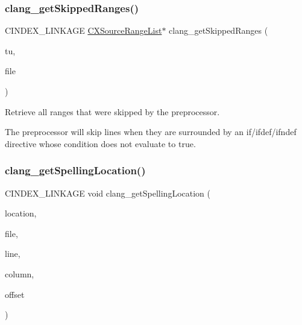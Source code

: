 \subsubsection{\texorpdfstring{clang\+\_\+get\+Skipped\+Ranges()}{clang\_getSkippedRanges()}}
{\footnotesize\ttfamily C\+I\+N\+D\+E\+X\+\_\+\+L\+I\+N\+K\+A\+GE \hyperlink{structCXSourceRangeList}{C\+X\+Source\+Range\+List}$\ast$ clang\+\_\+get\+Skipped\+Ranges (\begin{DoxyParamCaption}\item[{\hyperlink{group__CINDEX_gacdb7815736ca709ce9a5e1ec2b7e16ac}{C\+X\+Translation\+Unit}}]{tu,  }\item[{\hyperlink{group__CINDEX__FILES_gacfcea9c1239c916597e2e5b3e109215a}{C\+X\+File}}]{file }\end{DoxyParamCaption})}



Retrieve all ranges that were skipped by the preprocessor. 

The preprocessor will skip lines when they are surrounded by an if/ifdef/ifndef directive whose condition does not evaluate to true. \mbox{\label{group__CINDEX__LOCATIONS_ga01f1a342f7807ea742aedd2c61c46fa0}} 
\subsubsection{\texorpdfstring{clang\+\_\+get\+Spelling\+Location()}{clang\_getSpellingLocation()}}
{\footnotesize\ttfamily C\+I\+N\+D\+E\+X\+\_\+\+L\+I\+N\+K\+A\+GE void clang\+\_\+get\+Spelling\+Location (\begin{DoxyParamCaption}\item[{\hyperlink{structCXSourceLocation}{C\+X\+Source\+Location}}]{location,  }\item[{\hyperlink{group__CINDEX__FILES_gacfcea9c1239c916597e2e5b3e109215a}{C\+X\+File} $\ast$}]{file,  }\item[{unsigned $\ast$}]{line,  }\item[{unsigned $\ast$}]{column,  }\item[{unsigned $\ast$}]{offset }\end{DoxyParamCaption})}



